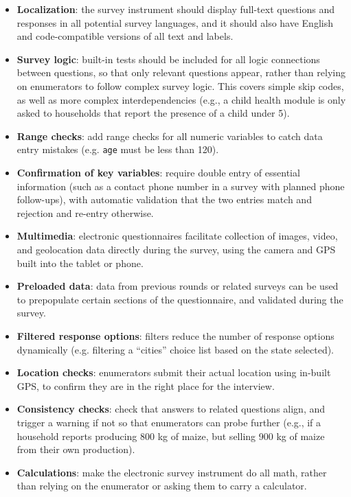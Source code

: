 \begin{itemize}
  \item{\textbf{Localization}}: the survey instrument should display full-text questions and responses in all potential survey languages, and it should also have English and code-compatible versions of all text and labels.
	\item{\textbf{Survey logic}}: built-in tests should be included for all logic connections between questions, so that only relevant questions appear, rather than relying on enumerators to follow complex survey logic. This covers simple skip codes, as well as more complex interdependencies (e.g., a child health module is only asked to households that report the presence of a child under 5).
	\item{\textbf{Range checks}}: add range checks for all numeric variables to catch data entry mistakes (e.g. \texttt{age} must be less than 120).
	\item{\textbf{Confirmation of key variables}}: require double entry of essential information (such as a contact phone number in a survey with planned phone follow-ups), with automatic validation that the two entries match and rejection and re-entry otherwise.
	\item{\textbf{Multimedia}}: electronic questionnaires facilitate collection of images, video, and geolocation data directly during the survey, using the camera and GPS built into the tablet or phone.
	\item{\textbf{Preloaded data}}: data from previous rounds or related surveys can be used to prepopulate certain sections of the questionnaire, and validated during the survey.
	\item{\textbf{Filtered response options}}: filters reduce the number of response options dynamically (e.g. filtering a ``cities'' choice list based on the state selected).
	\item{\textbf{Location checks}}: enumerators submit their actual location using in-built GPS, to confirm they are in the right place for the interview.
	\item{\textbf{Consistency checks}}: check that answers to related questions align, and trigger a warning if not so that enumerators can probe further (e.g., if a household reports producing 800 kg of maize, but selling 900 kg of maize from their own production).
	\item{\textbf{Calculations}}: make the electronic survey instrument do all math, rather than relying on the enumerator or asking them to carry a calculator.
\end{itemize}

